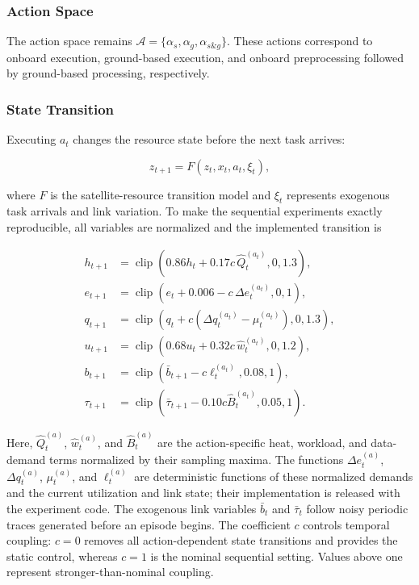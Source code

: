 \documentclass[lettersize,journal]{IEEEtran}
\begin{document}
\subsubsection{Action Space}

The action space remains $\mathcal{A}=\{\alpha_s,\alpha_g,\alpha_{s\&g}\}$. These actions correspond to onboard execution, ground-based execution, and onboard preprocessing followed by ground-based processing, respectively.

\subsubsection{State Transition}

Executing $a_t$ changes the resource state before the next task arrives:

\begin{equation}
z_{t+1}=F(z_t,x_t,a_t,\xi_t),
\label{eq:state_transition}
\end{equation}

where $F$ is the satellite-resource transition model and $\xi_t$ represents exogenous task arrivals and link variation. To make the sequential experiments exactly reproducible, all variables are normalized and the implemented transition is

\begin{equation}
\begin{aligned}
h_{t+1} &= \operatorname{clip}\!\left(0.86h_t+0.17c\,\widehat Q_t^{(a_t)},0,1.3\right),\\
e_{t+1} &= \operatorname{clip}\!\left(e_t+0.006-c\,\Delta e_t^{(a_t)},0,1\right),\\
q_{t+1} &= \operatorname{clip}\!\left(q_t+c(\Delta q_t^{(a_t)}-\mu_t^{(a_t)}),0,1.3\right),\\
u_{t+1} &= \operatorname{clip}\!\left(0.68u_t+0.32c\,\widehat w_t^{(a_t)},0,1.2\right),\\
b_{t+1} &= \operatorname{clip}\!\left(\bar b_{t+1}-c\ell_t^{(a_t)},0.08,1\right),\\
\tau_{t+1} &= \operatorname{clip}\!\left(\bar\tau_{t+1}-0.10c\widehat B_t^{(a_t)},0.05,1\right).
\end{aligned}
\label{eq:resource_transition}
\end{equation}

Here, $\widehat Q_t^{(a)}$, $\widehat w_t^{(a)}$, and $\widehat B_t^{(a)}$ are the action-specific heat, workload, and data-demand terms normalized by their sampling maxima. The functions $\Delta e_t^{(a)}$, $\Delta q_t^{(a)}$, $\mu_t^{(a)}$, and $\ell_t^{(a)}$ are deterministic functions of these normalized demands and the current utilization and link state; their implementation is released with the experiment code. The exogenous link variables $\bar b_t$ and $\bar\tau_t$ follow noisy periodic traces generated before an episode begins. The coefficient $c$ controls temporal coupling: $c=0$ removes all action-dependent state transitions and provides the static control, whereas $c=1$ is the nominal sequential setting. Values above one represent stronger-than-nominal coupling.
\end{document}
